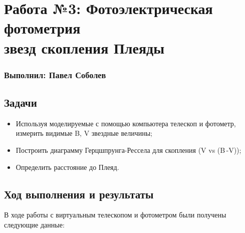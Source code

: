 




\section*{Работа №3: Фотоэлектрическая фотометрия \\ звезд скопления Плеяды}
\subsubsection*{Выполнил: Павел Соболев}

\vspace{3em}

\subsection*{Задачи}

\begin{itemize}
  \setlength\itemsep{-0.1em}
  \item Используя моделируемые с помощью компьютера телескоп и фотометр, измерить видимые B, V звездные величины;
  \item Построить диаграмму Герцшпрунга-Рессела для скопления (V vs (B\,-V));
  \item Определить расстояние до Плеяд.
\end{itemize}

\subsection*{Ход выполнения и результаты}

В ходе работы с виртуальным телескопом и фотометром были получены следующие данные:

